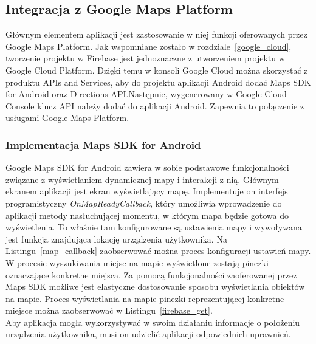 \subsection{Integracja z Google Maps Platform}

Głównym elementem aplikacji jest zastosowanie w niej funkcji oferowanych przez Google Maps Platform. Jak wspomniane zostało w rozdziale~\ref{google_cloud}, tworzenie projektu w Firebase
jest jednoznaczne z utworzeniem projektu w Google Cloud Platform. Dzięki temu w konsoli Google Cloud można skorzystać z produktu APIs and Services, aby do projektu aplikacji Android dodać
Maps SDK for Android oraz Directions API.\@ Następnie, wygenerowany w Google Cloud Console klucz API należy dodać do aplikacji Android. Zapewnia to połączenie z usługami Google Maps Platform.

    \subsubsection{Implementacja Maps SDK for Android}
    Google Maps SDK for Android zawiera w sobie podstawowe funkcjonalności związane z wyświetlaniem dynamicznej mapy i interakcji z nią. Głównym ekranem aplikacji jest ekran wyświetlający mapę.
    Implementuje on interfejs programistyczny \emph{OnMapReadyCallback}, który umożliwia wprowadzenie do aplikacji metody nasłuchującej momentu, w którym mapa będzie gotowa do wyświetlenia.
    To właśnie tam konfigurowane są ustawienia mapy i wywoływana jest funkcja znajdująca lokację urządzenia użytkownika. Na Listingu~\ref{map_callback} zaobserwować można proces konfiguracji
    ustawień mapy. W procesie wyszukiwania miejsc na mapie wyświetlone zostają pinezki oznaczające konkretne miejsca. Za pomocą funkcjonalności zaoferowanej przez Maps SDK możliwe jest 
    elastyczne dostosowanie sposobu wyświetlania obiektów na mapie. Proces wyświetlania na mapie pinezki reprezentującej konkretne miejsce można zaobserwować w Listingu~\ref{firebase_get}. \\

    Aby aplikacja mogła wykorzystywać w swoim działaniu informacje o położeniu urządzenia użytkownika, musi on udzielić aplikacji odpowiednich uprawnień.

